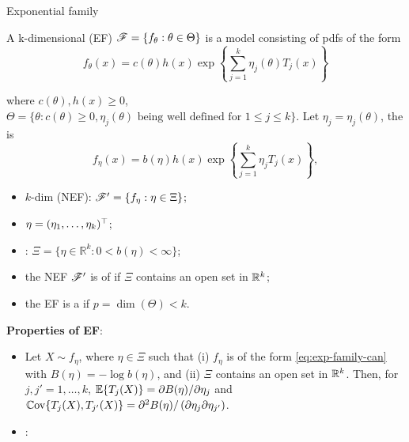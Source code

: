 \documentclass[10pt,a4paper]{book}
\begin{document}
\begin{defbox}{Exponential family}
	\begin{definition}\label{def:exp-family}
		A k-dimensional  (EF) $\mathscr{F}=\{f_\theta:\theta\in\Theta\}$ is a model consisting of pdfs of the form
		\begin{equation}\label{eq:exp-family-pdf}
			f_\theta(x)=c(\theta)h(x)\exp\left\{\sum_{j=1}^k\eta_j(\theta)T_j(x)\right\}
		\end{equation}
	\end{definition}
	where $c(\theta),h(x)\geq 0$, $\Theta=\{\theta:c(\theta)\geq 0, \eta_j(\theta) \text{ being well defined for } 1\leq j\leq k\}$. Let $\eta_j=\eta_j(\theta)$, the  is 
	\begin{equation}\label{eq:exp-family-can}
		f_\eta(x)=b(\eta)h(x)\exp\left\{\sum_{j=1}^k\eta_jT_j(x)\right\},
	\end{equation}
	\begin{itemize}[itemsep=2pt,topsep=0pt,parsep=0pt]
		\item $k$-dim  (NEF): $\mathscr{F}'=\{f_{\eta}:\eta\in \Xi\}$; 
		\item {} $\eta=(\eta_1,\ldots,\eta_k)^\top$;
		\item {}: $\Xi=\{\eta\in\mathbb{R}^k:0<b(\eta)<\infty\}$; 
		\item the NEF $\mathscr{F}'$ is of  if $\Xi$ contains an open set in $\mathbb R^k$;
		\item the EF is a  if $p=\dim(\Theta)<k$.
	\end{itemize}
\end{defbox}
\textbf{Properties of EF}:
\begin{itemize}[itemsep=2pt,topsep=0pt,parsep=0pt]
	\item Let $X\sim f_{\eta}$, where $\eta\in\Xi$ such that (i) $f_{\eta}$ is of the form \eqref{eq:exp-family-can} with $B(\eta)=-\log b(\eta)$, and (ii) $\Xi$ contains an open set in $\mathbb R^k$. Then, for $j,j'=1,\ldots,k$, $\mathbb E\{T_j(X)\}={\partial B(\eta)}/{\partial\eta_j}$ and $\mathbb{C}\mathrm{ov}\{T_j(X),T_{j'}(X)\}={\partial^2B(\eta)}/\left( {\partial\eta_j\partial\eta_{j'}}\right)$.  
	\item {}:
\end{itemize}
\end{document}
